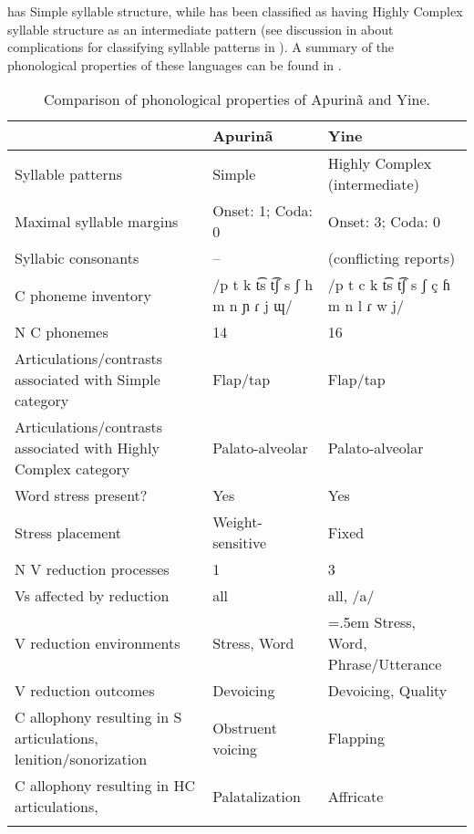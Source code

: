    has Simple syllable structure, while  has been classified as having Highly Complex syllable structure as an intermediate pattern (see discussion in  about complications for classifying syllable patterns in ). A summary of the phonological properties of these languages can be found in .

\begin{table}
\small
\begin{tabularx}{\textwidth}{IQQ}
\lsptoprule
 & {Apurinã} & {Yine}\\
 \midrule 
 {Syllable patterns} & Simple & Highly Complex (intermediate)\\
 \tablevspace
 {Maximal syllable margins} & Onset: 1; Coda: 0 & Onset: 3; Coda: 0\\
 \tablevspace
 {Syllabic consonants} & -- & (conflicting reports)\\
 \tablevspace
 {C phoneme inventory} & /p t k t͡s t͡ʃ s ʃ h m n ɲ ɾ j ɰ/ & /p t c k t͡s t͡ʃ s ʃ ç ɦ m n l ɾ w j/\\
 \tablevspace
 {N C phonemes} & 14 & 16\\
 \tablevspace
 {Articulations/contrasts associated with {Simple}} {category} & {Flap/tap} & {Flap/tap}\\
 \tablevspace
 {Articulations/contrasts associated with {Highly Complex}} {category} & { {Palato-alveolar}} & { {Palato-alveolar}}\\
 \tablevspace
 {Word stress present?} & {Yes} & {Yes}\\
 \tablevspace
 {Stress placement} & {Weight-sensitive} & {Fixed}\\
 \tablevspace
 {N V reduction processes} & {1} & {3}\\
 \tablevspace
 {Vs affected by reduction}  & {all} & {all, /a/}\\
 \tablevspace
 {V reduction environments} & {Stress, Word} &\hangindent=.5em Stress, Word, Phrase/Utterance\\
 \tablevspace
 {V reduction outcomes} & {Devoicing} & {Devoicing, Quality}\\
 \tablevspace
 {C allophony resulting in S articulations, lenition/sonorization} & {Obstruent voicing} & { {Flapping}}\\
 \tablevspace
 {{C allophony resulting in HC articulations,} } & {Palatalization} & { {Affricate}}\\
\lspbottomrule
\end{tabularx}
\caption{\label{tab:8.3}Comparison of phonological properties of Apurinã and Yine.}
\end{table}

